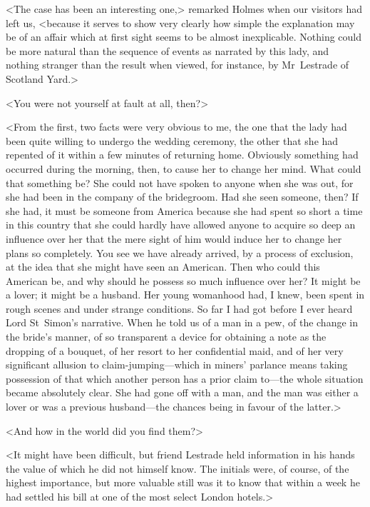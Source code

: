 <The case has been an interesting one,> remarked Holmes when our visitors had left us, <because it serves to show very clearly how simple the explanation may be of an affair which at first sight seems to be almost inexplicable. Nothing could be more natural than the sequence of events as narrated by this lady, and nothing stranger than the result when viewed, for instance, by Mr~Lestrade of Scotland Yard.>

<You were not yourself at fault at all, then?>

<From the first, two facts were very obvious to me, the one that the lady had been quite willing to undergo the wedding ceremony, the other that she had repented of it within a few minutes of returning home. Obviously something had occurred during the morning, then, to cause her to change her mind. What could that something be? She could not have spoken to anyone when she was out, for she had been in the company of the bridegroom. Had she seen someone, then? If she had, it must be someone from America because she had spent so short a time in this country that she could hardly have allowed anyone to acquire so deep an influence over her that the mere sight of him would induce her to change her plans so completely. You see we have already arrived, by a process of exclusion, at the idea that she might have seen an American. Then who could this American be, and why should he possess so much influence over her? It might be a lover; it might be a husband. Her young womanhood had, I knew, been spent in rough scenes and under strange conditions. So far I had got before I ever heard Lord St~Simon's narrative. When he told us of a man in a pew, of the change in the bride's manner, of so transparent a device for obtaining a note as the dropping of a bouquet, of her resort to her confidential maid, and of her very significant allusion to claim-jumping—which in miners' parlance means taking possession of that which another person has a prior claim to—the whole situation became absolutely clear. She had gone off with a man, and the man was either a lover or was a previous husband—the chances being in favour of the latter.>

<And how in the world did you find them?>

<It might have been difficult, but friend Lestrade held information in his hands the value of which he did not himself know. The initials were, of course, of the highest importance, but more valuable still was it to know that within a week he had settled his bill at one of the most select London hotels.>

